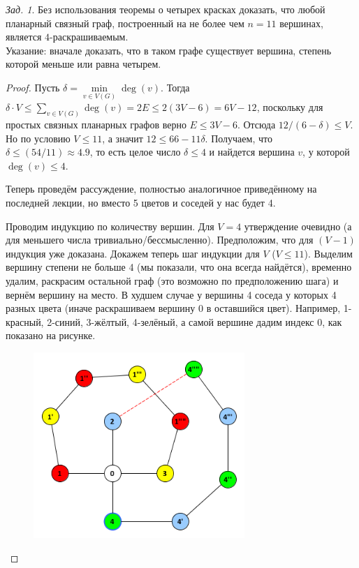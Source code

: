 \documentclass[a4paper,12pt]{article}
\theoremstyle{remark}
\newtheorem{problem}{Зад.}[section]
\begin{document}
\begin{problem}
	Без использования теоремы о четырех красках доказать, что любой планарный связный граф, построенный на не более чем $n=11$ вершинах, является $4$-раскрашиваемым. \\
	Указание: вначале доказать, что в таком графе существует вершина, степень которой меньше или равна четырем.
\end{problem}
\begin{proof}
	
	Пусть $\delta = \min \limits_{v \in V(G)} \deg(v)$.
	Тогда $\delta \cdot V \leqslant \sum \limits_{v \in V(G)} {\deg(v)}
	      = 2E \leqslant 2(3V-6) = 6V-12$,
	поскольку для простых связных планарных графов верно $E \leqslant 3V-6$.
	Отсюда $ 12 / (6 - \delta) \leqslant V$.
	Но по условию $V \leqslant 11$, а значит $12 \leqslant 66 - 11 \delta$.
	Получаем, что $\delta \leqslant (54 / 11) \approx 4.9$,
	то есть целое число $\delta \leqslant 4$
	и найдется вершина $v$, у которой $\deg(v) \leqslant 4$.
	
	Теперь проведём рассуждение, полностью аналогичное приведённому на последней лекции, но вместо 5 цветов и соседей у нас будет 4.
	
	Проводим индукцию по количеству вершин. Для $V=4$ утверждение очевидно (а для меньшего числа тривиально/бессмысленно). Предположим, что для $(V-1)$ индукция уже доказана. Докажем теперь шаг индукции для $V$ ($V \leqslant 11$). Выделим вершину степени не больше 4 (мы показали, что она всегда найдётся), временно удалим, раскрасим остальной граф (это возможно по предположению шага) и вернём вершину на место. В худшем случае у вершины 4 соседа у которых 4 разных цвета (иначе раскрашиваем вершину 0 в оставшийся цвет). Например, 1-красный, 2-синий, 3-жёлтый, 4-зелёный, а самой вершине дадим индекс 0, как показано на рисунке.
	
	\begin{figure}[H]
		\centering
		\includegraphics[width=8cm]{stepik-lesson12347-step8-problem.png}
	\end{figure}


\end{proof}
\end{document}
